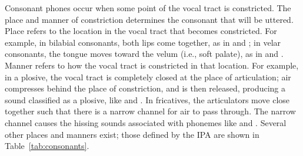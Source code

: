 Consonant phones occur when some point
of the vocal tract is constricted.
The place and manner of constriction
determines the consonant that will be uttered.
Place refers to the location in the vocal tract
that becomes constricted.
For example, in bilabial consonants,
both lips come together,
as in \ipa{[m]} and \ipa{[b]};
in velar consonants,
the tongue moves toward the velum
(i.e., soft palate),
as in \ipa{[k]} and \ipa{[g]}.
Manner refers to how the vocal tract
is constricted in that location.
For example, in a plosive,
the vocal tract is completely closed
at the place of articulation;
air compresses behind the place of constriction,
and is then released,
producing a sound classified
as a plosive, like \ipa{[t]} and \ipa{[k]}.
In fricatives,
the articulators move close together
such that there is a narrow channel
for air to pass through.
The narrow channel causes
the hissing sounds associated
with phonemes like \ipa{[s]} and \ipa{[f]}.
Several other places and manners exist;
those defined by the IPA are shown
in Table~\ref{tab:consonants}.

